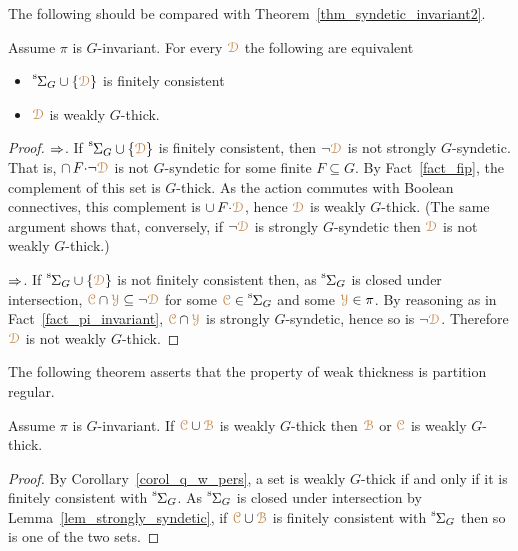 The following should be compared with Theorem~\ref{thm_syndetic_invariant2}.

\begin{corollary}\label{corol_q_w_pers}
  Assume $\pi$ is $G$-invariant.
  For every ${\color{brown}\EuScript D}$ the following are equivalent
  \begin{itemize}
    \item [1.] ${\mathstrut}^{\rm s}\kern-.1ex\Sigma_G\cup\{{\color{brown}\EuScript D}\}$ is finitely consistent
    \item [2.] ${\color{brown}\EuScript D}$ is weakly $G$-thick.
  \end{itemize}
\end{corollary}

\begin{proof}
  $\Rightarrow$.
  If ${\mathstrut}^{\rm s}\kern-.1ex\Sigma_G\cup\{{\color{brown}\EuScript D}\}$ is finitely consistent, then $\neg{\color{brown}\EuScript D}$ is not strongly $G$-syndetic.
  That is, $\cap\,F{\cdot}\neg{\color{brown}\EuScript D}$ is not $G$-syndetic for some finite $F\subseteq G$.
  By Fact~\ref{fact_fip}, the complement of this set is $G$-thick.
  As the action commutes with Boolean connectives, this complement is $\cup\,F{\cdot}{\color{brown}\EuScript D}$, hence ${\color{brown}\EuScript D}$ is weakly $G$-thick.
  (The same argument shows that, conversely, if $\neg{\color{brown}\EuScript D}$ is strongly $G$-syndetic then ${\color{brown}\EuScript D}$ is not weakly $G$-thick.)

  $\Rightarrow$.
  If ${\mathstrut}^{\rm s}\kern-.1ex\Sigma_G\cup\{{\color{brown}\EuScript D}\}$ is not finitely consistent then, as ${\mathstrut}^{\rm s}\kern-.1ex\Sigma_G$ is closed under intersection, ${\color{brown}\EuScript C}\cap{\color{brown}\EuScript Y}\subseteq\neg{\color{brown}\EuScript D}$ for some ${\color{brown}\EuScript C}\in{\mathstrut}^{\rm s}\kern-.1ex\Sigma_G$ and some ${\color{brown}\EuScript Y}\in\pi$.
  By reasoning as in  Fact~\ref{fact_pi_invariant}, ${\color{brown}\EuScript C}\cap{\color{brown}\EuScript Y}$ is strongly $G$-syndetic, hence so is $\neg{\color{brown}\EuScript D}$.
  Therefore ${\color{brown}\EuScript D}$ is not weakly $G$-thick.
\end{proof}

The following theorem asserts that the property of weak thickness is partition regular.

\begin{theorem}\label{thm_wt_partreg}
  Assume $\pi$ is $G$-invariant.
  If ${\color{brown}\EuScript C}\cup{\color{brown}\EuScript B}$ is weakly $G$-thick then ${\color{brown}\EuScript B}$ or ${\color{brown}\EuScript C}$ is weakly $G$-thick.
\end{theorem}

\begin{proof}
  By Corollary~\ref{corol_q_w_pers}, a set is weakly $G$-thick if and only if it is finitely consistent with ${\mathstrut}^{\rm s}\kern-.1ex\Sigma_G$.
  As ${\mathstrut}^{\rm s}\kern-.1ex\Sigma_G$ is closed under intersection by Lemma~\ref{lem_strongly_syndetic}, if ${\color{brown}\EuScript C}\cup{\color{brown}\EuScript B}$ is finitely consistent with ${\mathstrut}^{\rm s}\kern-.1ex\Sigma_G$ then so is one of the two sets.
\end{proof}

